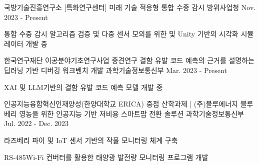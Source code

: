 \begin{cventries}


\cventry
  {국방기술진흥연구소 [특화연구센터]} %
  {미래 기술 적응형 통합 수중 감시} %
  {\faFlask\space 방위사업청} %
  {Nov. 2023 - Present} %
  {
    \begin{cvitems} %
      \item {통합 수중 감시 알고리즘 검증 및 다중 센서 모의를 위한 및 Unity 기반의 시각화 시뮬레이터 개발 중}
    \end{cvitems}
  }

\cventry
  {한국연구재단 이공분야기초연구사업 중견연구} %
  {결함 유발 코드 예측의 근거를 설명하는 딥러닝 기반 디버깅 워크벤치 개발} %
  {\faFlask\space 과학기술정보통신부} %
  {Mar. 2023 - Present} %
  {
    \begin{cvitems} %
      \item { XAI 및 LLM기반의 결함 유발 코드 예측 모델 개발 중}
    \end{cvitems}
  }

\cventry
  {인공지능융합혁신인재양성(한양대학교 ERICA) 중점 산학과제 | \faBuilding[regular] (주)블루에너지} %
  {블루베리 영농을 위한 인공지능 기반 저비용 스마트팜 전환 솔루션} %
  {\faFlask\space 과학기술정보통신부} %
  {Jul. 2022 - Dec. 2023} %
  {
    \begin{cvitems} %
      \item {라즈베리 파이 및 IoT 센서 기반의 작물 모니터링 체계 구축}
      \item {RS-485{\enskip\cdotp\enskip}Wi-Fi 컨버터를 활용한 태양광 발전량 모니터링 프로그램 개발}
    \end{cvitems}
  }


\end{cventries}
